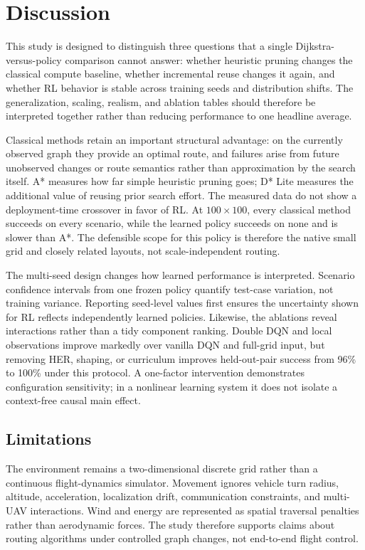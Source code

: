 \section{Discussion}
\label{sec:discussion}

This study is designed to distinguish three questions that a single
Dijkstra-versus-policy comparison cannot answer: whether heuristic pruning
changes the classical compute baseline, whether incremental reuse changes it
again, and whether RL behavior is stable across training seeds and distribution
shifts. The generalization, scaling, realism, and ablation tables should
therefore be interpreted together rather than reducing performance to one
headline average.

Classical methods retain an important structural advantage: on the currently
observed graph they provide an optimal route, and failures arise from future
unobserved changes or route semantics rather than approximation by the search
itself. A* measures how far simple heuristic pruning goes; D* Lite measures the
additional value of reusing prior search effort. The measured data do not show
a deployment-time crossover in favor of RL. At $100\times100$, every classical
method succeeds on every scenario, while the learned policy succeeds on none
and is slower than A*. The defensible scope for this policy is therefore the
native small grid and closely related layouts, not scale-independent routing.

The multi-seed design changes how learned performance is interpreted. Scenario
confidence intervals from one frozen policy quantify test-case variation, not
training variance. Reporting seed-level values first ensures the uncertainty
shown for RL reflects independently learned policies. Likewise, the ablations
reveal interactions rather than a tidy component ranking. Double DQN and local
observations improve markedly over vanilla DQN and full-grid input, but
removing HER, shaping, or curriculum improves held-out-pair success from 96\%
to 100\% under this protocol. A one-factor intervention demonstrates
configuration sensitivity; in a nonlinear learning system it does not isolate
a context-free causal main effect.

\subsection{Limitations}
\label{sec:limitations}

The environment remains a two-dimensional discrete grid rather than a
continuous flight-dynamics simulator. Movement ignores vehicle turn radius,
altitude, acceleration, localization drift, communication constraints, and
multi-UAV interactions. Wind and energy are represented as spatial traversal
penalties rather than aerodynamic forces. The study therefore supports claims
about routing algorithms under controlled graph changes, not end-to-end flight
control.

